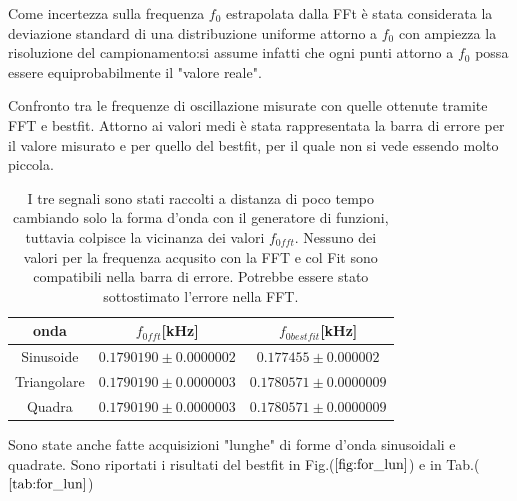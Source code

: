\documentclass{article}
\begin{document}
        Come incertezza sulla frequenza $f_0$ estrapolata dalla FFt è stata 
        considerata la deviazione standard di una distribuzione uniforme attorno
        a $f_0$ con ampiezza la risoluzione del campionamento:si assume infatti
         che ogni punti attorno a $f_0$ possa essere equiprobabilmente il "valore reale".  
         

        \begin{table}[H]
            \centering
            \caption{Confronto tra le frequenze di oscillazione misurate con quelle ottenute tramite FFT e bestfit.
                    Attorno ai valori medi è stata rappresentata la barra di errore per il valore
                    misurato e per quello del bestfit, per il quale non si vede essendo molto piccola.}
                \begin{tabular}{ccc}
                    onda            &   $f_{0fft}$[kHz]                     & $f_{0bestfit}$[kHz] \\
                    \hline
                    Sinusoide       &   $0.1790190 \pm 0.0000002$           & $0.177455 \pm 0.000002$ \\
                    Triangolare     &   $0.1790190 \pm 0.0000003$           & $0.1780571\pm 0.0000009$ \\
                    Quadra          &   $0.1790190 \pm 0.0000003$           & $0.1780571 \pm 0.0000009$ \\
                \end{tabular}
                \caption{I tre segnali sono stati raccolti a distanza di poco tempo
                        cambiando solo la forma d'onda con il generatore di funzioni,
                        tuttavia colpisce la vicinanza dei valori $f_{0fft}$.
                        Nessuno dei valori per la frequenza acqusito con la FFT
                        e col Fit sono compatibili nella barra di errore.
                        Potrebbe essere stato sottostimato l'errore nella FFT.}
                \label{tab:for_ond}
        \end{table}

        Sono state anche fatte acquisizioni "lunghe" di forme d'onda sinusoidali
         e quadrate. Sono riportati i risultati del bestfit in Fig.($\ref{fig:for_lun}$)
         e in Tab.($\ref{tab:for_lun}$)

         
\end{document}
